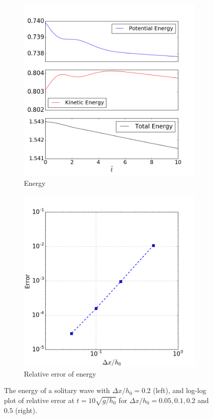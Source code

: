 \documentclass[review]{elsarticle}
\begin{document}
\begin{figure}[!htb]
    \centering
    \begin{subfigure}[b]{0.45\textwidth}
        \includegraphics[width=\textwidth]{_fig/soliton_energy.png}
        \caption{Energy}
        \label{fig:soliton_energy}
    \end{subfigure}
    \begin{subfigure}[b]{0.45\textwidth}
        \includegraphics[width=\textwidth]{_fig/soliton_energy_dx.png}
        \caption{Relative error of energy}
        \label{fig:soliton_energy_dx}
    \end{subfigure}
    \caption{The energy of a solitary wave
    with $\Delta x/h_0 = 0.2$ (left), 
    and log-log plot of relative error 
    at $t=10\sqrt{g/h_0}$ for $\Delta x/h_0 = 0.05, 0.1, 0.2$ and $0.5$ (right).}
    \label{fig:soliton_error_energy}
\end{figure}
\end{document}
